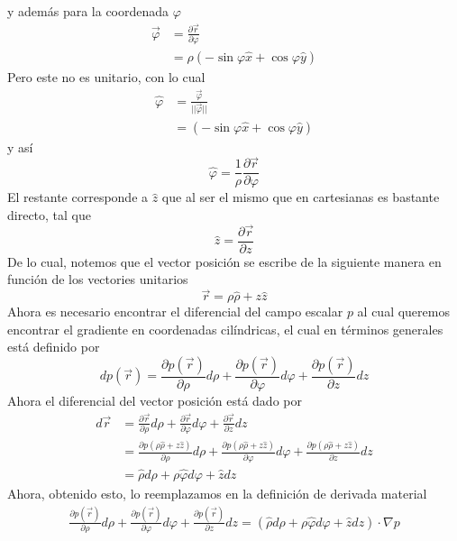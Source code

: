 \documentclass[11pt,letterpaper]{article}
\begin{document}
y además para la coordenada $\varphi$
\begin{align*}
    \vec{\varphi}&=\frac{\partial \vec{r}}{\partial \varphi} \\
    & = \rho (-\sin{\varphi}\hat{x} + \cos{\varphi}\hat{y})
\end{align*}
Pero este no es unitario, con lo cual
\begin{align*}
    \hat{\varphi} & =\frac{\vec{\varphi}}{||\vec{\varphi}||} \\
    & = (-\sin{\varphi}\hat{x} + \cos{\varphi}\hat{y})
\end{align*}
y así
\begin{equation}
    \hat{\varphi}=\frac{1}{\rho}\frac{\partial \vec{r}}{\partial \varphi}
\end{equation}
El restante corresponde a $\hat{z}$ que al ser el mismo que en cartesianas es bastante directo, tal que
\begin{equation}
    \hat{z}=\frac{\partial \vec{r}}{\partial z}
\end{equation}
De lo cual, notemos que el vector posición se escribe de la siguiente manera en función de los vectories unitarios
\begin{equation}
    \vec{r}=\rho\hat{\rho}+z\hat{z}
\end{equation}
Ahora es necesario encontrar el diferencial del campo escalar $p$ al cual queremos encontrar el gradiente en coordenadas cilíndricas, el cual en términos generales está definido por
\begin{equation}
    dp(\vec{r})=  \frac{\partial p (\vec{r})}{\partial \rho}d\rho+\frac{\partial p(\vec{r})}{\partial \varphi}d\varphi+\frac{\partial p(\vec{r})}{\partial z}dz
\end{equation}
Ahora el diferencial del vector posición está dado por
\begin{align*}
     d\vec{r}& =  \frac{\partial \vec{r}}{\partial \rho}d\rho+\frac{\partial \vec{r}}{\partial \varphi}d\varphi+\frac{\partial \vec{r}}{\partial z}dz \\
    & = \frac{\partial p (\rho\hat{\rho}+z\hat{z})}{\partial \rho}d\rho+\frac{\partial p(\rho\hat{\rho}+z\hat{z})}{\partial \varphi}d\varphi+\frac{\partial p(\rho\hat{\rho}+z\hat{z}) }{\partial z}dz \\
    & = \hat{\rho}d\rho + \rho\hat{\varphi}d\varphi + \hat{z}dz
\end{align*}
Ahora, obtenido esto, lo reemplazamos en la definición de derivada material
\begin{align*}
    \frac{\partial p (\vec{r})}{\partial \rho}d\rho+\frac{\partial p(\vec{r})}{\partial \varphi}d\varphi+\frac{\partial p(\vec{r})}{\partial z}dz = (\hat{\rho}d\rho + \rho\hat{\varphi}d\varphi + \hat{z}dz ) \cdot \nabla p
\end{align*}
\end{document}
